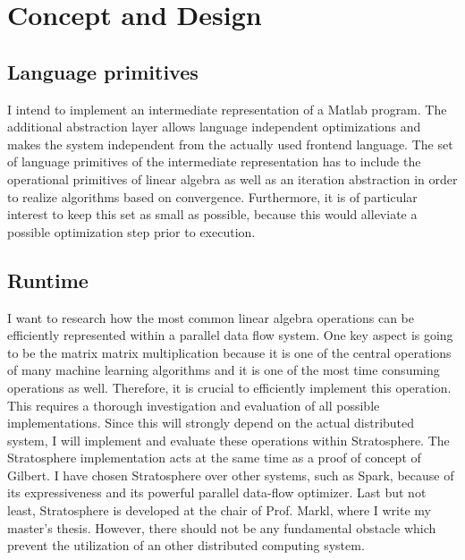 \chapter{Concept and Design}
\label{cha:conceptanddesign}

\section{Language primitives}

I intend to implement an intermediate representation of a Matlab program.
The additional abstraction layer allows language independent optimizations and makes the system independent from the actually used frontend language.
The set of language primitives of the intermediate representation has to include the operational primitives of linear algebra as well as an iteration abstraction in order to realize algorithms based on convergence.
Furthermore, it is of particular interest to keep this set as small as possible, because this would alleviate a possible optimization step prior to execution.

\section{Runtime}

I want to research how the most common linear algebra operations can be efficiently represented within a parallel data flow system.
One key aspect is going to be the matrix matrix multiplication because it is one of the central operations of many machine learning algorithms and it is one of the most time consuming operations as well.
Therefore, it is crucial to efficiently implement this operation.
This requires a thorough investigation and evaluation of all possible implementations.
Since this will strongly depend on the actual distributed system, I will implement and evaluate these operations within Stratosphere.
The Stratosphere implementation acts at the same time as a proof of concept of Gilbert.
I have chosen Stratosphere over other systems, such as Spark, because of its expressiveness and its powerful parallel data-flow optimizer.
Last but not least, Stratosphere is developed at the chair of Prof. Markl, where I write my master's thesis.
However, there should not be any fundamental obstacle which prevent the utilization of an other distributed computing system.
